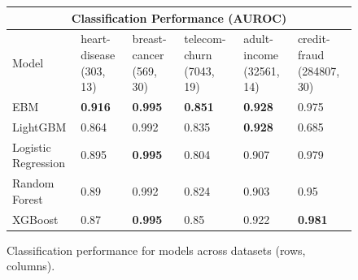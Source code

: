 \documentclass[twoside,11pt]{article}
\begin{document}

\begin{figure}[ht]
\begin{tabular}{ |p{3.2cm}||p{1.5cm}|p{1.5cm}|p{2cm}|p{2cm}|p{2.1cm} | }
 \hline
 \multicolumn{6}{|c|}{Classification Performance (AUROC)} \\
 \hline
 Model & heart-disease (303, 13) & breast-cancer (569, 30) & telecom-churn (7043, 19) & adult-income (32561, 14)  & credit-fraud (284807, 30)\\
 \hline
 EBM & \textbf{0.916} & \textbf{0.995} & \textbf{0.851} & \textbf{0.928} & 0.975\\
 LightGBM & 0.864 & 0.992 & 0.835 & \textbf{0.928} & 0.685\\
 Logistic Regression & 0.895 & \textbf{0.995} & 0.804 & 0.907 & 0.979\\
 Random Forest & 0.89 & 0.992 & 0.824 & 0.903 & 0.95 \\
 XGBoost & 0.87 & \textbf{0.995} & 0.85 & 0.922 & \textbf{0.981}\\
 \hline
\end{tabular}
\caption{Classification performance for models across datasets (rows, columns).}
\end{figure}
\end{document}
